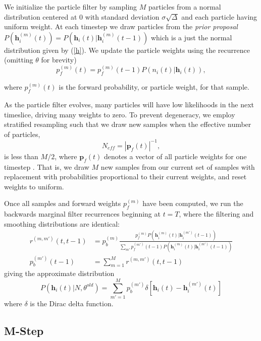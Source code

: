 \documentclass{article}
\begin{document}
We initialize the particle filter by sampling $M$ particles from a
normal distribution centered at 0 with standard deviation
$\sigma\sqrt{\Delta}$ and each particle having uniform weight. At each timestep we draw
particles from the \emph{prior proposal}
$P(\mathbf{h}_i^{(m)}(t)) = P(\mathbf{h}_i(t) | \mathbf{h}_i^{(m)}(t - 1))$
which is a just the normal distribution given by (\ref{h}). We update
the particle weights using the recurrence (omitting $\theta$ for brevity)
\begin{equation} \label{pf}
p_f^{(m)}(t) = p_f^{(m)}(t - 1)P(n_i(t) | \mathbf{h}_i(t)),
\end{equation}

where $p_f^{(m)}(t)$ is the forward probability, or particle weight, for that sample.

As the particle filter evolves, many particles will have low
likelihoods in the next timeslice, driving many weights to zero.
To prevent degeneracy, we employ stratified resampling such that we draw new samples when the effective number of particles,
\begin{equation} \label{Neff}
N_{eff} = \left|\mathbf{p}_f(t)\right|^{-1},
\end{equation}
is less than $M/2$, where $\mathbf{p}_f(t)$ denotes a vector of all
particle weights for one timestep \citep{volgelstein2009}. That is,
we draw $M$ new samples from our current set of samples with
replacement with probabilities proportional to their current weights,
and reset weights to uniform.

Once all samples and forward weights $p_f^{(m)}$ have been computed,
we run the backwards marginal filter recurrences beginning at $t=T$,
where the filtering and smoothing distributions are identical:
\begin{align}
r^{(m,m')}(t, t - 1) &= p_b^{(m)}\frac{p_f^{(m)}P(\mathbf{h}_i^{(m)}(t)|\mathbf{h}_i^{(m')}(t - 1))}{\sum_{m'} p_f^{(m')}(t - 1) P(\mathbf{h}_i^{(m)}(t)|\mathbf{h}_i^{(m')}(t - 1))} \\
p_b^{(m')}(t - 1)    &= \sum_{m=1}^M r^{(m,m')}(t, t - 1)
\end{align}
giving the approximate distribution
\begin{equation} \label{Ph}
P(\mathbf{h}_i(t) | N, \theta^{old}) = \sum_{m'=1}^{M} p_b^{(m')} \delta\left[\mathbf{h}_i(t) - \mathbf{h}_i^{(m')}(t)\right]
\end{equation}
where $\delta$ is the Dirac delta function.

\subsection{M-Step}
\end{document}
